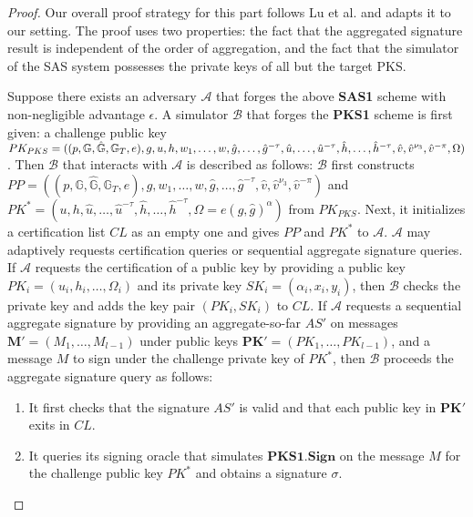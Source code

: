 \documentclass[11pt,letterpaper]{article}
\newcommand{\vect}[1]{\mathbf{#1}}
\newcommand{\G}{\mathbb{G}}
\newcommand{\mc}[1]{\mathcal{#1}}
\newcommand{\tb}[1]{\textbf{#1}}
\newcommand{\lb}{\linebreak[0]}
\begin{document}
\begin{proof}
Our overall proof strategy for this part follows Lu et al. \cite{LuOSSW06}
and adapts it to our setting. The proof uses two properties: the fact that
the aggregated signature result is independent of the order of aggregation,
and the fact that the simulator of the SAS system possesses the private keys
of all but the target PKS.

Suppose there exists an adversary $\mc{A}$ that forges the above \tb{SAS1}
scheme with non-negligible advantage $\epsilon$. A simulator $\mc{B}$ that
forges the \tb{PKS1} scheme is first given: a challenge public key
    $PK_{PKS} = (
    (p, \G, \hat{\G}, \G_T, e),
    g, u, h, w_1, \ldots, w, \lb
    \hat{g}, \ldots, \hat{g}^{-\tau},
    \hat{u}, \ldots, \hat{u}^{-\tau}, \lb
    \hat{h}, \ldots, \hat{h}^{-\tau},
    \hat{v}, \hat{v}^{\nu_3}, \hat{v}^{-\pi}, \Omega )$.
Then $\mc{B}$ that interacts with $\mc{A}$ is described as follows:
$\mc{B}$ first constructs
    $PP = ( (p, \G, \hat{\G}, \G_T, e),
    g, w_1, \ldots, w, \hat{g}, \ldots, \hat{g}^{-\tau},
    \hat{v}, \hat{v}^{\nu_3}, \hat{v}^{-\pi} )$
and
    $PK^* = ( u, h,
    \hat{u}, \ldots, \hat{u}^{-\tau}, \hat{h}, \ldots, \hat{h}^{-\tau},
    \Omega = e(g, \hat{g})^{\alpha} )$
from $PK_{PKS}$. Next, it initializes a certification list $CL$ as an empty
one and gives $PP$ and $PK^*$ to $\mc{A}$.
$\mc{A}$ may adaptively requests certification queries or sequential
aggregate signature queries. If $\mc{A}$ requests the certification of a
public key by providing a public key $PK_i = (u_i, h_i, \ldots, \Omega_i)$
and its private key $SK_i = (\alpha_i, x_i, y_i)$, then $\mc{B}$ checks the
private key and adds the key pair $(PK_i, SK_i)$ to $CL$.
If $\mc{A}$ requests a sequential aggregate signature by providing an
aggregate-so-far $AS'$ on messages $\vect{M}' = (M_1, \ldots, M_{l-1})$ under
public keys $\vect{PK}' = (PK_1, \ldots, PK_{l-1})$, and a message $M$ to
sign under the challenge private key of $PK^*$, then $\mc{B}$ proceeds the
aggregate signature query as follows:
\begin{enumerate}
\item It first checks that the signature $AS'$ is valid and that each
    public key in $\vect{PK}'$ exits in $CL$.

\item It queries its signing oracle that simulates $\textbf{PKS1.Sign}$ on
    the message $M$ for the challenge public key $PK^*$ and obtains a
    signature $\sigma$.


\end{enumerate}
\end{proof}
\end{document}

